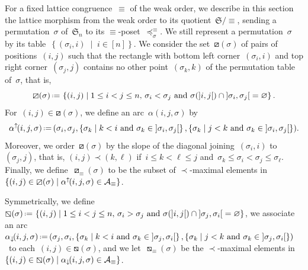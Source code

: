 \documentclass{amsart}
\theoremstyle{definition}
\newcommand{\f}[1]{{\mathfrak{#1}}} %
\newcommand{\set}[2]{\left\{ #1 \;\middle|\; #2 \right\}} %
\newcommand{\eqdef}{\mbox{\,\raisebox{0.2ex}{\scriptsize\ensuremath{\mathrm:}}\ensuremath{=}\,}} %
\newcommand{\Vincent}[1]{\todo[color=blue!30,inline]{#1 \\ \hfill --- V.}}
\newcommand{\arcs}{{\mathcal{A}}} %
\newcommand{\arcDown}{\smash{\alpha_{\downarrow\!}}} %
\newcommand{\arcUp}{\smash{\alpha^{\uparrow\!}}} %
\begin{document}
For a fixed lattice congruence~$\equiv$ of the weak order, we describe in this section the lattice morphism from the weak order to its quotient~$\f{S}/{\equiv}$, sending a permutation~$\sigma$ of~$\f{S}_n$ to its $\equiv$-poset~$\preccurlyeq_\sigma^\equiv$.
%
%
%
%
We still represent a permutation~$\sigma$ by its table~$\set{(\sigma_i, i)}{i \in [n]}$.
We consider the set~$\boxslash(\sigma)$ of pairs of positions~$(i,j)$ such that the rectangle with bottom left corner~$(\sigma_i, i)$ and top right corner~$(\sigma_j, j)$ contains no other point~$(\sigma_k, k)$ of the permutation table of~$\sigma$, that is,
\[
\boxslash(\sigma) \eqdef \set{(i, j)}{1 \le i < j \le n, \, \sigma_i < \sigma_j \text{ and } \sigma({]i,j[}) \cap {]\sigma_i, \sigma_j[} = \varnothing}.
\]
For~$(i, j) \in \boxslash(\sigma)$, we define an arc~$\alpha(i, j, \sigma)$ by
\[
\arcUp(i, j, \sigma) \eqdef (\sigma_i, \sigma_j, \set{\sigma_k}{k < i \text{ and } \sigma_k \in {]\sigma_i, \sigma_j[}}, \set{\sigma_k}{j < k \text{ and } \sigma_k \in {]\sigma_i, \sigma_j[}}).
\]
Moreover, we order~$\boxslash(\sigma)$ by the slope of the diagonal joining~$(\sigma_i, i)$ to~$(\sigma_j, j)$, that is, $(i, j) \prec (k,\ell)$ if~$i \le k < \ell \le j$ and~$\sigma_k \le \sigma_i < \sigma_j \le \sigma_\ell$.
Finally, we define~$\boxslash_\equiv(\sigma)$ to be the subset of $\prec$-maximal elements in~$\set{(i, j) \in \boxslash(\sigma)}{\arcUp(i, j, \sigma) \in \arcs_\equiv}$.

Symmetrically, we define~$\boxbslash(\sigma) \eqdef \set{(i, j)}{1 \le i < j \le n, \, \sigma_i > \sigma_j \text{ and } \sigma({]i,j[}) \cap {]\sigma_j, \sigma_i[} = \varnothing}$, we associate an arc~$\arcDown(i, j, \sigma) \eqdef (\sigma_j, \sigma_i, \set{\sigma_k}{k < i \text{ and } \sigma_k \in {]\sigma_j, \sigma_i[}}, \set{\sigma_k}{j < k \text{ and } \sigma_k \in {]\sigma_j, \sigma_i[}})$~to each~${(i,j) \in \boxbslash(\sigma)}$, and we let~$\boxbslash_\equiv(\sigma)$ be the $\prec$-maximal elements in~$\set{(i, j) \in \boxbslash(\sigma)}{\arcDown(i, j, \sigma) \in \arcs_\equiv}$.
\end{document}
